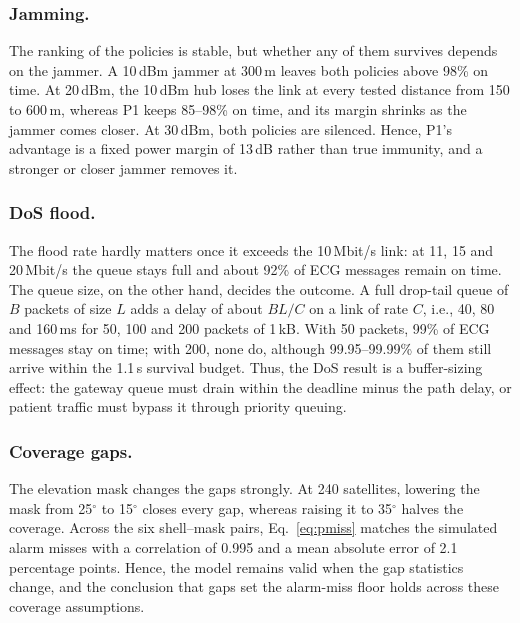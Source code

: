 \subsubsection{Jamming.} The ranking of the policies is stable, but whether any of them survives depends on the jammer. A 10\,dBm jammer at 300\,m leaves both policies above 98\% on time. At 20\,dBm, the 10\,dBm hub loses the link at every tested distance from 150 to 600\,m, whereas P1 keeps 85--98\% on time, and its margin shrinks as the jammer comes closer. At 30\,dBm, both policies are silenced. Hence, P1's advantage is a fixed power margin of 13\,dB rather than true immunity, and a stronger or closer jammer removes it. %

\subsubsection{DoS flood.} The flood rate hardly matters once it exceeds the 10\,Mbit/s link: at 11, 15 and 20\,Mbit/s the queue stays full and about 92\% of ECG messages remain on time. The queue size, on the other hand, decides the outcome. A full drop-tail queue of $B$ packets of size $L$ adds a delay of about $BL/C$ on a link of rate $C$, i.e., 40, 80 and 160\,ms for 50, 100 and 200 packets of 1\,kB. With 50 packets, 99\% of ECG messages stay on time; with 200, none do, although 99.95--99.99\% of them still arrive within the 1.1\,s survival budget. Thus, the DoS result is a buffer-sizing effect: the gateway queue must drain within the deadline minus the path delay, or patient traffic must bypass it through priority queuing.

\subsubsection{Coverage gaps.} The elevation mask changes the gaps strongly. At 240 satellites, lowering the mask from 25$^\circ$ to 15$^\circ$ closes every gap, whereas raising it to 35$^\circ$ halves the coverage. Across the six shell--mask pairs, Eq.~\eqref{eq:pmiss} matches the simulated alarm misses with a correlation of 0.995 and a mean absolute error of 2.1 percentage points. Hence, the model remains valid when the gap statistics change, and the conclusion that gaps set the alarm-miss floor holds across these coverage assumptions.
